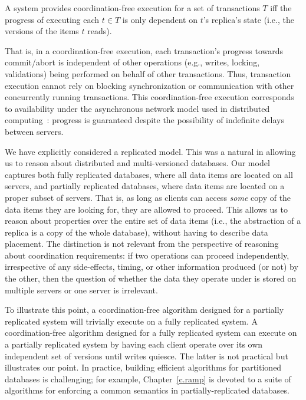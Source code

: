 \begin{definition}
  A system provides coordination-free execution for a set of
  transactions $T$ iff the progress of executing each $t\in T$ is only
  dependent on $t$'s replica's state (i.e., the versions of the items
  $t$ reads).
\end{definition}

\noindent That is, in a coordination-free execution, each
transaction's progress towards commit/abort is independent of other
operations (e.g., writes, locking, validations) being performed on
behalf of other transactions. Thus, transaction execution cannot rely
on blocking synchronization or communication with other concurrently
running transactions. This coordination-free execution corresponds to
availability under the asynchronous network model used in
distributed computing~\cite{gilbert-cap}: progress is guaranteed
despite the possibility of indefinite delays between servers.


 We have explicitly considered
a replicated model. This was a natural in allowing us to reason about
distributed and multi-versioned databases. Our model captures both
fully replicated databases, where all data items are located on all
servers, and partially replicated databases, where data items are
located on a proper subset of servers. That is, as long as clients can
access \textit{some} copy of the data items they are looking for, they
are allowed to proceed. This allows us to reason about properties over
the entire set of data items (i.e., the abstraction of a replica is a
copy of the whole database), without having to describe data
placement. The distinction is not relevant from the perspective of
reasoning about coordination requirements: if two operations can
proceed independently, irrespective of any side-effects, timing, or
other information produced (or not) by the other, then the question of
whether the data they operate under is stored on multiple servers or
one server is irrelevant.

To illustrate this point, a coordination-free algorithm designed for a
partially replicated system will trivially execute on a fully
replicated system. A coordination-free algorithm designed for a fully
replicated system can execute on a partially replicated system by
having each client operate over its own independent set of versions
until writes quiesce. The latter is not practical but illustrates our
point. In practice, building efficient algorithms for partitioned
databases is challenging; for example, Chapter~\ref{c.ramp} is devoted
to a suite of algorithms for enforcing a common semantics in
partially-replicated databases.


